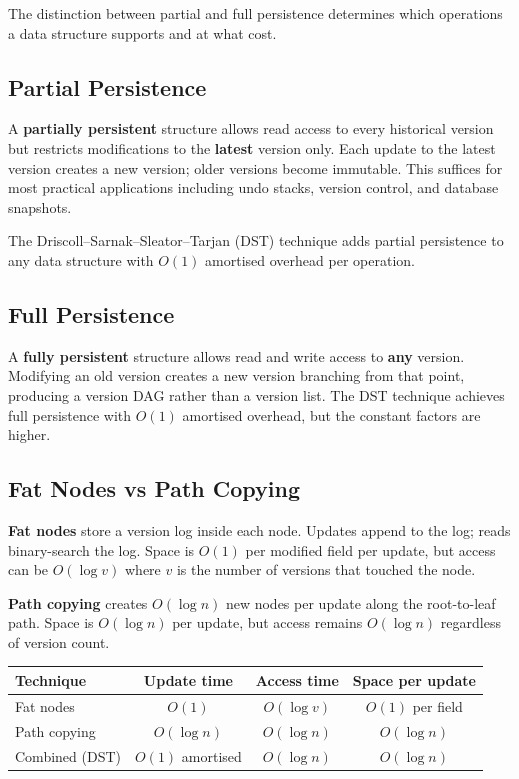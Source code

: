 The distinction between partial and full persistence determines which operations a data structure supports and at what cost.

\subsection{Partial Persistence}

A \textbf{partially persistent} structure allows read access to every historical version but restricts modifications to the \textbf{latest} version only. Each update to the latest version creates a new version; older versions become immutable. This suffices for most practical applications including undo stacks, version control, and database snapshots.

The Driscoll--Sarnak--Sleator--Tarjan (DST) technique adds partial persistence to any data structure with $O(1)$ amortised overhead per operation.

\subsection{Full Persistence}

A \textbf{fully persistent} structure allows read and write access to \textbf{any} version. Modifying an old version creates a new version branching from that point, producing a version DAG rather than a version list. The DST technique achieves full persistence with $O(1)$ amortised overhead, but the constant factors are higher.

\subsection{Fat Nodes vs Path Copying}

\textbf{Fat nodes} store a version log inside each node. Updates append to the log; reads binary-search the log. Space is $O(1)$ per modified field per update, but access can be $O(\log v)$ where $v$ is the number of versions that touched the node.

\textbf{Path copying} creates $O(\log n)$ new nodes per update along the root-to-leaf path. Space is $O(\log n)$ per update, but access remains $O(\log n)$ regardless of version count.

\begin{center}
\begin{tabular}{lccc}
\toprule
Technique & Update time & Access time & Space per update \\
\midrule
Fat nodes & $O(1)$ & $O(\log v)$ & $O(1)$ per field \\
Path copying & $O(\log n)$ & $O(\log n)$ & $O(\log n)$ \\
Combined (DST) & $O(1)$ amortised & $O(\log n)$ & $O(\log n)$ \\
\bottomrule
\end{tabular}
\end{center}

